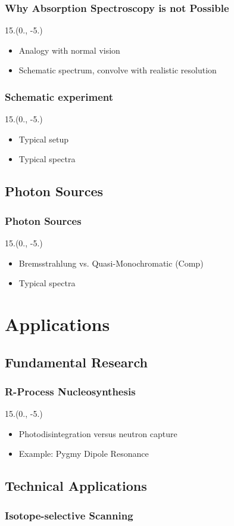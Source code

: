 \documentclass{beamer}
\begin{document}
\begin{frame}
    \frametitle{Why Absorption Spectroscopy is not Possible}
    \begin{textblock}{15.}(0., -5.)
        \begin{itemize}
            \item Analogy with normal vision
            \item Schematic spectrum, convolve with realistic resolution
        \end{itemize}
    \end{textblock}
\end{frame}

\begin{frame}
    \frametitle{Schematic experiment}
    \begin{textblock}{15.}(0., -5.)
        \begin{itemize}
            \item Typical setup
            \item Typical spectra
        \end{itemize}
    \end{textblock}
\end{frame}

\subsection{Photon Sources}

\begin{frame}
    \frametitle{Photon Sources}
    \begin{textblock}{15.}(0., -5.)
        \begin{itemize}
            \item Bremsstrahlung vs. Quasi-Monochromatic (Comp)
            \item Typical spectra
        \end{itemize}
    \end{textblock}
\end{frame}

\section{Applications}

\subsection{Fundamental Research}

\begin{frame}
    \frametitle{R-Process Nucleosynthesis}
    \begin{textblock}{15.}(0., -5.)
        \begin{itemize}
            \item Photodisintegration versus neutron capture
            \item Example: Pygmy Dipole Resonance
        \end{itemize}
    \end{textblock}    
\end{frame}

\subsection{Technical Applications}

\begin{frame}
    \frametitle{Isotope-selective Scanning}
\end{frame}
\end{document}

